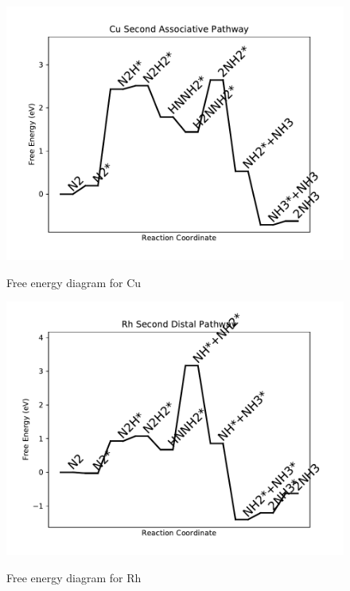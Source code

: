 \documentclass{article}
\begin{document}
\begin{figure}
\includegraphics[width=1\linewidth]{data/plots/Cu_associative_2.pdf}
\label{fig:Cu_associative_2}
\caption{Free energy diagram for Cu}
\end{figure}

\clearpage
\begin{figure}
\includegraphics[width=1\linewidth]{data/plots/Rh_distal_2.pdf}
\label{fig:Rh_distal_2}
\caption{Free energy diagram for Rh}
\end{figure}
\end{document}
